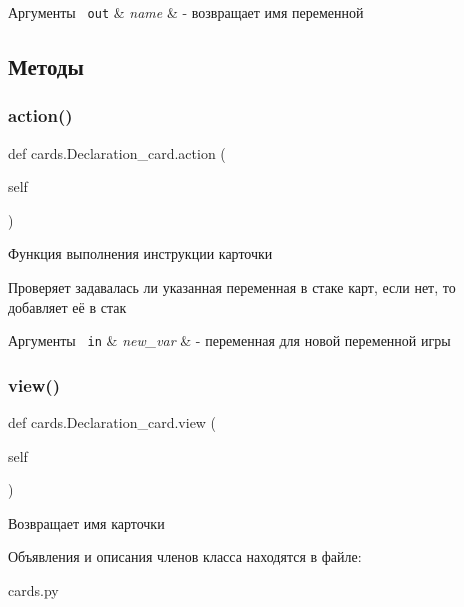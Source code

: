 \begin{DoxyParams}[1]{Аргументы}
\mbox{\texttt{ out}}  & {\em name} & -\/ возвращает имя переменной \\
\hline
\end{DoxyParams}


\subsection{Методы}
\mbox{\label{classcards_1_1_declaration__card_a140fd766bb5e5acbd9d2444c691d49bb}} 
\subsubsection{\texorpdfstring{action()}{action()}}
{\footnotesize\ttfamily def cards.\+Declaration\+\_\+card.\+action (\begin{DoxyParamCaption}\item[{}]{self }\end{DoxyParamCaption})}



Функция выполнения инструкции карточки 

Проверяет задавалась ли указанная переменная в стаке карт, если нет, то добавляет её в стак 
\begin{DoxyParams}[1]{Аргументы}
\mbox{\texttt{ in}}  & {\em new\+\_\+var} & -\/ переменная для новой переменной игры \\
\hline
\end{DoxyParams}
\mbox{\label{classcards_1_1_declaration__card_afbed322f27dcd9c68e422a91f695d83c}} 
\subsubsection{\texorpdfstring{view()}{view()}}
{\footnotesize\ttfamily def cards.\+Declaration\+\_\+card.\+view (\begin{DoxyParamCaption}\item[{}]{self }\end{DoxyParamCaption})}



Возвращает имя карточки 



Объявления и описания членов класса находятся в файле\+:\begin{DoxyCompactItemize}
\item 
cards.\+py\end{DoxyCompactItemize}
